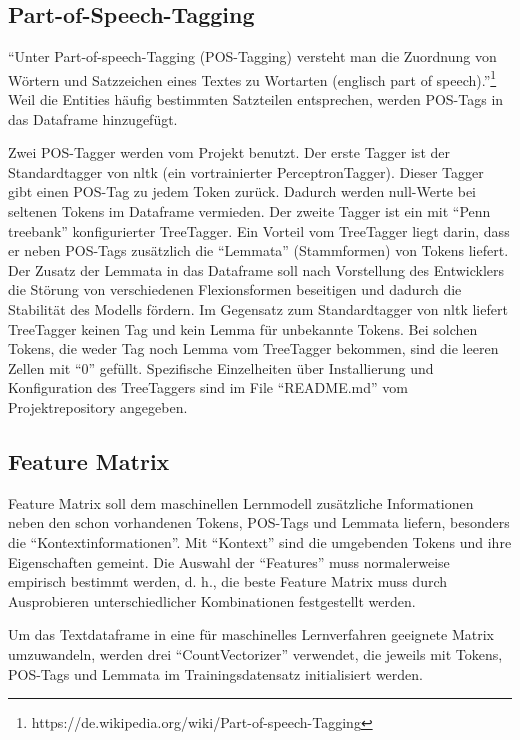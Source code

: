 \documentclass[paper=A4, ngerman, fontsize=12pt]{article}
\begin{document}
	\subsection{Part-of-Speech-Tagging}
	\noindent
	\enquote{Unter Part-of-speech-Tagging (POS-Tagging) versteht man die Zuordnung von Wörtern und Satzzeichen eines Textes zu Wortarten (englisch part of speech).}\footnote{https://de.wikipedia.org/wiki/Part-of-speech-Tagging} Weil die Entities häufig bestimmten Satzteilen entsprechen, werden POS-Tags in das Dataframe hinzugefügt. 
	
	\indent
	Zwei POS-Tagger werden vom Projekt benutzt. Der erste Tagger ist der Standardtagger von nltk (ein vortrainierter PerceptronTagger). Dieser Tagger gibt einen POS-Tag zu jedem Token zurück. Dadurch werden null-Werte bei seltenen Tokens im Dataframe vermieden. Der zweite Tagger ist ein mit \enquote{Penn treebank} konfigurierter TreeTagger. Ein Vorteil vom TreeTagger liegt darin, dass er neben POS-Tags zusätzlich die \enquote{Lemmata} (Stammformen) von Tokens liefert. Der Zusatz der Lemmata in das Dataframe soll nach Vorstellung des Entwicklers die Störung von verschiedenen Flexionsformen beseitigen und dadurch die Stabilität des Modells fördern. Im Gegensatz zum Standardtagger von nltk liefert TreeTagger keinen Tag und kein Lemma für unbekannte Tokens. Bei solchen Tokens, die weder Tag noch Lemma vom TreeTagger bekommen, sind die leeren Zellen mit \enquote{0} gefüllt. Spezifische Einzelheiten über Installierung und Konfiguration des TreeTaggers sind im File \enquote{README.md} vom Projektrepository angegeben. 
	
	\subsection{Feature Matrix}
	\noindent
	Feature Matrix soll dem maschinellen Lernmodell zusätzliche Informationen neben den schon vorhandenen Tokens, POS-Tags und Lemmata liefern, besonders die \enquote{Kontextinformationen}. Mit \enquote{Kontext} sind die umgebenden Tokens und ihre Eigenschaften gemeint. Die Auswahl der \enquote{Features} muss normalerweise empirisch bestimmt werden, d. h., die beste Feature Matrix muss durch Ausprobieren unterschiedlicher Kombinationen festgestellt werden. 
	
	\indent
	Um das Textdataframe in eine für maschinelles Lernverfahren geeignete Matrix umzuwandeln, werden drei \enquote{CountVectorizer} verwendet, die jeweils mit Tokens, POS-Tags und Lemmata im Trainingsdatensatz initialisiert werden. 
	
\end{document}
